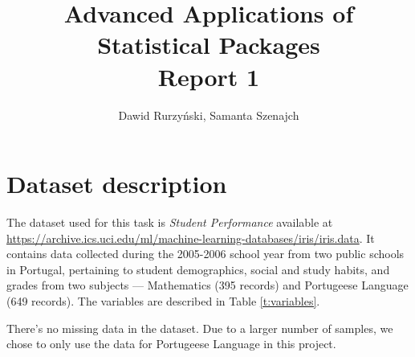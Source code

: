 \documentclass[12pt, a4paper]{article}\usepackage[]{graphicx}\usepackage[]{xcolor}
\begin{document}

\title{Advanced Applications of Statistical Packages\\
Report 1}
\author{Dawid Rurzyński, Samanta Szenajch}
\maketitle

\tableofcontents 

\newpage

\section{Dataset description}

The dataset used for this task is \emph{Student Performance} available at \url{https://archive.ics.uci.edu/ml/machine-learning-databases/iris/iris.data}. It contains data collected during the 2005-2006 school year from two public schools in Portugal, pertaining to student demographics, social and study habits, and grades from two subjects --- Mathematics (395 records) and Portugeese Language (649 records). The variables are described in Table \ref{t:variables}.

There's no missing data in the dataset. Due to a larger number of samples, we chose to only use the data for Portugeese Language in this project.
\end{document}
